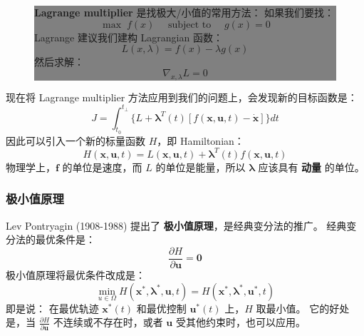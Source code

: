 \documentclass[orivec]{llncs}
\newcommand{\emp}[1]{\textbf{\textcolor{Cerulean}{#1}}}
\newcommand{\vect}[1]{\boldsymbol{#1}}
\begin{document}
\begin{figure}[H]
\begin{center}
\colorbox{grey}{\parbox{0.95\textwidth}{\setlength{\parskip}{2.5ex}

\emp{Lagrange multiplier} 是找极大/小值的常用方法： 如果我们要找：
\begin{equation}
\max \; f(x) \quad \mbox{ subject to } \quad g(x) = 0
\end{equation}
Lagrange 建议我们建构 Lagrangian 函数：
\begin{equation}
L(x, \lambda) = f(x) - \lambda g(x)
\end{equation}
然后求解：
\begin{equation}
\nabla_{x,\lambda} L = 0
\end{equation}
}}
\end{center}
\end{figure}

现在将 Lagrange multiplier 方法应用到我们的问题上，会发现新的目标函数是：
\begin{equation}
J = \int_{t_0}^{t_\bot} \{ L + \vect{\lambda}^T(t) \left[ f(\vect{x}, \vect{u}, t) - \dot{\vect{x}} \right] \} dt
\end{equation}
因此可以引入一个新的标量函数 $H$，即 Hamiltonian：
\begin{equation}
H(\vect{x}, \vect{u}, t) = L(\vect{x}, \vect{u}, t) + \vect{\lambda}^T(t) f(\vect{x}, \vect{u}, t)
\end{equation}
物理学上，$\vect{f}$ 的单位是速度，而 $L$ 的单位是能量，所以 $\vect{\lambda}$ 应该具有 \emp{动量} 的单位。

\subsubsection{极小值原理}

Lev Pontryagin (1908-1988) 提出了 \emp{极小值原理}，是经典变分法的推广。 经典变分法的最优条件是：
\begin{equation}
\frac{\partial H}{\partial \vect{u}} = \vect{0}
\end{equation}
极小值原理将最优条件改成是：
\begin{equation}
\min_{u \in \Omega} H(\vect{x}^*, \vect{\lambda}^*, \vect{u}, t) = H(\vect{x}^*, \vect{\lambda}^*, \vect{u}^*, t)
\end{equation}
即是说： 在最优轨迹 $\vect{x}^*(t)$ 和最优控制 $\vect{u}^*(t)$ 上，$H$ 取最小值。 它的好处是，当 $\displaystyle \frac{\partial H}{\partial \vect{u}}$ 不连续或不存在时，或者 $\vect{u}$ 受其他约束时，也可以应用。
\end{document}
